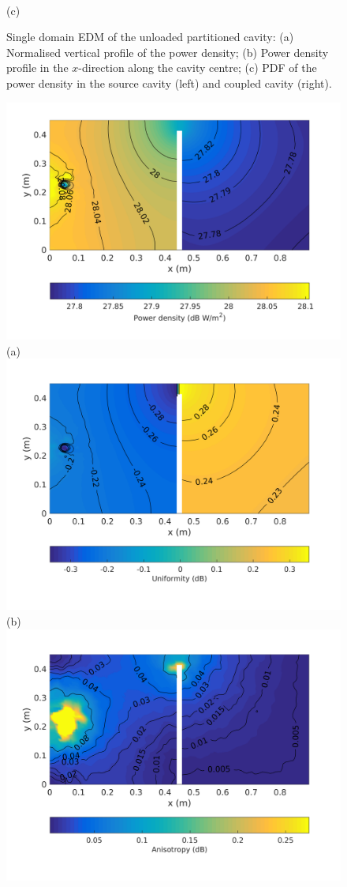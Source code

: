 \documentclass[a4paper]{article}
\numberwithin{equation}{section}
\begin{document}
\begin{figure}[ht]
\begin{center}
\\
{\footnotesize (c)}\\
\vspace{-2mm}
\caption{\label{fg:partemptysdm_profs} Single domain EDM of the unloaded partitioned cavity: (a) Normalised vertical profile of the power density; 
(b) Power density profile in the $x$-direction along the cavity centre; (c) PDF of the power density in the source cavity (left) and coupled cavity (right).}
\end{center}
\end{figure}

\begin{figure}[ht]
\begin{center}
\includegraphics[trim={0 11mm 0 12mm},clip,width=0.55\linewidth]{figures/SDM_3D_DU_PowerDensityMap}\\
{\footnotesize (a)}\\
\vspace{2mm}
\includegraphics[trim={0 11mm 0 12mm},clip,width=0.55\linewidth]{figures/SDM_3D_DU_EnergyDensityUniformityMap}\\
{\footnotesize (b)}\\
\vspace{2mm}
\includegraphics[trim={0 11mm 0 12mm},clip,width=0.55\linewidth]{figures/SDM_3D_DU_EnergyDensityAnisotropyMap}\\

\end{center}
\end{figure}
\end{document}
